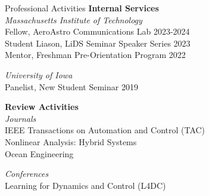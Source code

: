 \begin{rSection}{Professional Activities}
    \textbf{Internal Services}\\
    \textit{Massachusetts Institute of Technology}\\
    Fellow, AeroAstro Communications Lab \hfill 2023-2024\\
    Student Liason, LiDS Seminar Speaker Series \hfill 2023\\
    Mentor, Freshman Pre-Orientation Program \hfill 2022

    \textit{University of Iowa}\\
    Panelist, New Student Seminar \hfill 2019

    \textbf{Review Activities}\\
    \textit{Journals}\\
    IEEE Transactions on Automation and Control (TAC)\\
    Nonlinear Analysis: Hybrid Systems\\
    Ocean Engineering

    \textit{Conferences}\\
    Learning for Dynamics and Control (L4DC)\\

\end{rSection}